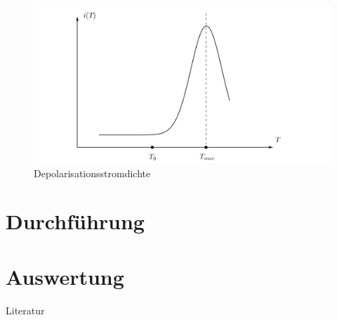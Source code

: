 \begin{figure}[H]
\includegraphics[width=\textwidth]{../pics/i(T).png}
\caption{Depolarisationsstromdichte}
\label{pic_i(T)}
\end{figure}


\section{Durchführung}

\section{Auswertung}

\parskip 340pt
\Large{Literatur}\\\\





